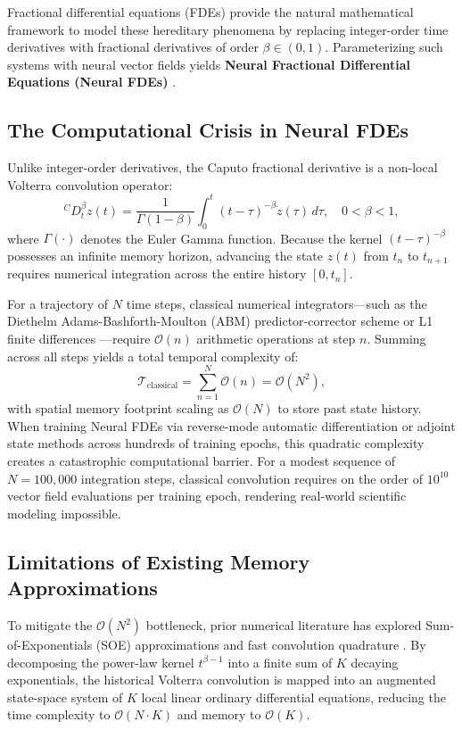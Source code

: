 \documentclass[11pt,a4paper]{article}
\theoremstyle{plain}
\theoremstyle{definition}
\newcommand{\cD}{{}^C D}
\begin{document}
Fractional differential equations (FDEs) provide the natural mathematical framework to model these hereditary phenomena by replacing integer-order time derivatives with fractional derivatives of order $\beta \in (0, 1)$. Parameterizing such systems with neural vector fields yields \textbf{Neural Fractional Differential Equations (Neural FDEs)} \cite{rackauckas2020universal,pang2019fpinns}.

\subsection{The Computational Crisis in Neural FDEs}
Unlike integer-order derivatives, the Caputo fractional derivative is a non-local Volterra convolution operator:
\begin{equation}
    \cD_t^\beta z(t) = \frac{1}{\Gamma(1-\beta)} \int_0^t (t - \tau)^{-\beta} \dot{z}(\tau) \, d\tau, \quad 0 < \beta < 1,
    \label{eq:caputo_def_intro}
\end{equation}
where $\Gamma(\cdot)$ denotes the Euler Gamma function. Because the kernel $(t-\tau)^{-\beta}$ possesses an infinite memory horizon, advancing the state $z(t)$ from $t_n$ to $t_{n+1}$ requires numerical integration across the entire history $[0, t_n]$. 

For a trajectory of $N$ time steps, classical numerical integrators---such as the Diethelm Adams-Bashforth-Moulton (ABM) predictor-corrector scheme \cite{diethelm2002predictor} or L1 finite differences \cite{lubich1986discretized}---require $\mathcal{O}(n)$ arithmetic operations at step $n$. Summing across all steps yields a total temporal complexity of:
\begin{equation}
    \mathcal{T}_{\mathrm{classical}} = \sum_{n=1}^N \mathcal{O}(n) = \mathcal{O}(N^2),
\end{equation}
with spatial memory footprint scaling as $\mathcal{O}(N)$ to store past state history. When training Neural FDEs via reverse-mode automatic differentiation or adjoint state methods across hundreds of training epochs, this quadratic complexity creates a catastrophic computational barrier. For a modest sequence of $N = 100,000$ integration steps, classical convolution requires on the order of $10^{10}$ vector field evaluations per training epoch, rendering real-world scientific modeling impossible.

\subsection{Limitations of Existing Memory Approximations}
To mitigate the $\mathcal{O}(N^2)$ bottleneck, prior numerical literature has explored Sum-of-Exponentials (SOE) approximations \cite{jiang2017fast,beylkin2005approximation} and fast convolution quadrature \cite{schadle2006fast,lopez2006contour}. By decomposing the power-law kernel $t^{\beta-1}$ into a finite sum of $K$ decaying exponentials, the historical Volterra convolution is mapped into an augmented state-space system of $K$ local linear ordinary differential equations, reducing the time complexity to $\mathcal{O}(N \cdot K)$ and memory to $\mathcal{O}(K)$.
\end{document}
